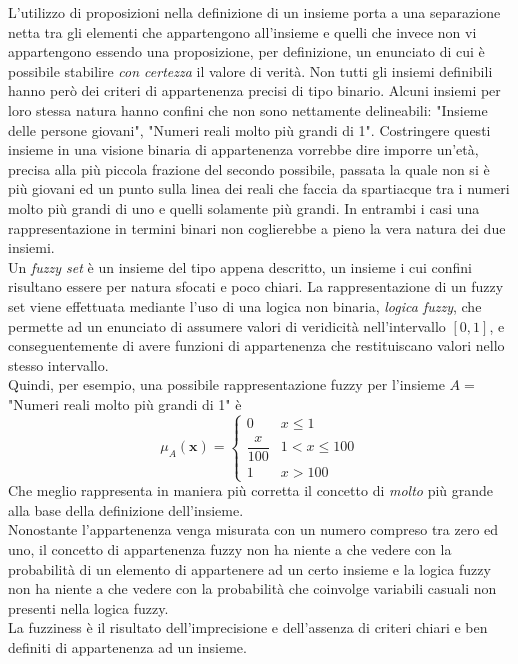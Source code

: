 \documentclass [10pt,a4paper,twoside,openright] {book}
\begin{document}
L'utilizzo di proposizioni nella definizione di un insieme porta a una separazione netta tra gli elementi che appartengono all'insieme e quelli che invece non vi appartengono essendo una proposizione, per definizione, un enunciato di cui è possibile stabilire \emph{con certezza} il valore di verità.
Non tutti gli insiemi definibili hanno però dei criteri di appartenenza precisi di tipo binario. Alcuni insiemi per loro stessa natura hanno confini che non sono nettamente delineabili: "Insieme delle persone giovani", "Numeri reali molto più grandi di 1". Costringere questi insieme in una visione binaria di appartenenza vorrebbe dire imporre un'età, precisa alla più piccola frazione del secondo possibile, passata la quale non si è più giovani ed un punto sulla linea dei reali che faccia da spartiacque tra i numeri molto più grandi di uno e quelli solamente più grandi. In entrambi i casi una rappresentazione in termini binari non coglierebbe a pieno la vera natura dei due insiemi.\\
Un \textit{fuzzy set} è un insieme del tipo appena descritto, un insieme i cui confini risultano essere per natura sfocati e poco chiari. La rappresentazione di un fuzzy set viene effettuata mediante l'uso di una logica non binaria, \textit{logica fuzzy}, che permette ad un enunciato di assumere valori di veridicità nell'intervallo $[0,1]$, e conseguentemente di avere funzioni di appartenenza che restituiscano valori nello stesso intervallo.\\
Quindi, per esempio, una possibile rappresentazione fuzzy per l'insieme $A=$"Numeri reali molto più grandi di 1" è
\[
\mu_A(\mathbf{x})=
\begin{cases}
0 & x \leq 1 \\
\dfrac{x}{100} & 1 < x \leq 100 \\
1 & x > 100
\end{cases}
\]
Che meglio rappresenta in maniera più corretta il concetto di \emph{molto} più grande alla base della definizione dell'insieme.\\
Nonostante l'appartenenza venga misurata con un numero compreso tra zero ed uno, il concetto di appartenenza fuzzy non ha niente a che vedere con la probabilità di un elemento di appartenere ad un certo insieme e la logica fuzzy non ha niente a che vedere con la probabilità che coinvolge variabili casuali non presenti nella logica fuzzy.\\
La fuzziness è il risultato dell'imprecisione e dell'assenza di criteri chiari e ben definiti di appartenenza ad un insieme.
\end{document}
